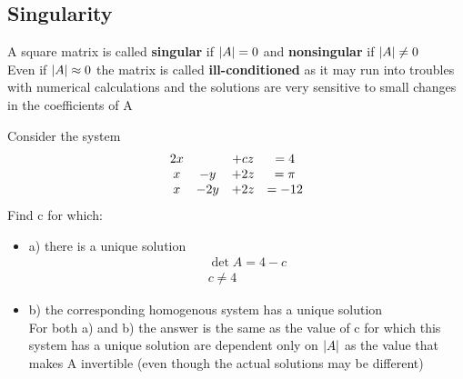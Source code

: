 \documentclass{article}
\begin{document}
    \subsection{Singularity}
    A square matrix is called \textbf{singular} if $\abs{A}=0$ and \textbf{nonsingular} if $\abs{A}\neq 0$\\
    Even if $\abs{A} \approx 0$ the matrix is called \textbf{ill-conditioned} as it may run into troubles with numerical calculations and the solutions are very sensitive to small changes in the coefficients of A\\
    \begin{problem}
        Consider the system\\
        \begin{gather*}
            \mqty{2x & &+ cz & =4\\
            x & -y & + 2z & = \pi\\
            x & -2y & +2z & =-12}
        \end{gather*}
        Find c for which:\\
        \begin{itemize}
            \item a) there is a unique solution\\
            \begin{gather*}
                \det{A} = 4-c\\
                c\neq 4
            \end{gather*}
            \item b) the corresponding homogenous system has a unique solution\\
            For both a) and b) the answer is the same as the value of c for which this system has a unique solution are dependent only on $\abs{A}$ as the value that makes A invertible  (even though the actual solutions may be different)
        \end{itemize}

    \end{problem}
\end{document}

